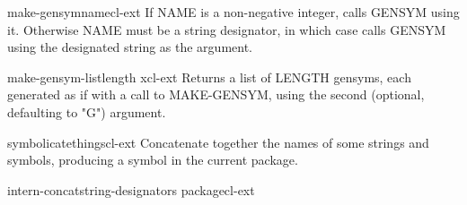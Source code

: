 \begin{function}{make-gensym}{name}{cl-ext}{}
  If NAME is a non-negative integer, calls GENSYM using it. Otherwise NAME
must be a string designator, in which case calls GENSYM using the designated
string as the argument.
\end{function}

\begin{function}{make-gensym-list}{length \op x}{cl-ext}{}
  Returns a list of LENGTH gensyms, each generated as if with a call to MAKE-GENSYM,
using the second (optional, defaulting to "G") argument.
\end{function}

\begin{function}{symbolicate}{\rest things}{cl-ext}{}
  Concatenate together the names of some strings and symbols,
producing a symbol in the current package.
\end{function}

\begin{function}{intern-concat}{string-designators \op package}{cl-ext}{}
  
\end{function}

